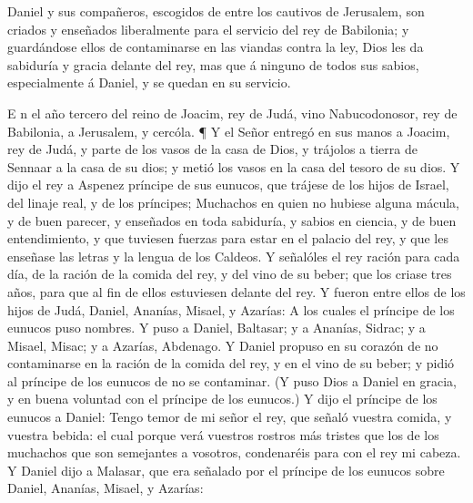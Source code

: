 \bchapter[capítulo]

\begin{chaptercomment}
 \footnotemarkchapter{}
Daniel y sus compañeros, escogidos de entre los cautivos de Jerusalem, son
  criados y enseñados liberalmente para el servicio del rey de Babilonia; y guardándose
  ellos de contaminarse en las viandas contra la ley, Dios les da sabiduría
  y gracia delante del rey, mas que á ninguno de todos sus sabios, especialmente
  á Daniel, y se quedan en su servicio.
\end{chaptercomment}

\vspace{\baselineskip}

\bversenonum \lettrine[lines=6,loversize=0.05,lraise=+0.08]{E}{}%
n el año tercero del reino de Joacim, rey de Judá, vino Nabucodonosor, rey de Babilonia, a Jerusalem, y cercóla.
\bverse ¶ Y el Señor entregó en sus manos a Joacim, rey de Judá, y parte de los vasos de la casa de Dios, y trájolos a tierra de Sennaar a la casa de su dios; y metió los vasos en la casa del tesoro de su dios.
\bverse Y dijo el rey a Aspenez príncipe de sus eunucos, que trájese de los hijos de Israel, del linaje real, y de los príncipes;
\bverse Muchachos en quien no hubiese alguna mácula, y de buen parecer, y enseñados en toda sabiduría, y sabios en ciencia, y de buen entendimiento, y que tuviesen fuerzas para estar en el palacio del rey, y que les enseñase las letras y la lengua de los Caldeos.
\bverse Y señalóles el rey ración para cada día, de la ración de la comida del rey, y del vino de su beber; que los criase tres años, para que al fin de ellos estuviesen delante del rey.
\bverse Y fueron entre ellos de los hijos de Judá, Daniel, Ananías, Misael, y Azarías:
\bverse A los cuales el príncipe de los eunucos puso nombres. Y puso a Daniel, Baltasar; y a Ananías, Sidrac; y a Misael, Misac; y a Azarías, Abdenago.
\bverse Y Daniel propuso en su corazón de no contaminarse en la ración de la comida del rey, y en el vino de su beber; y pidió al príncipe de los eunucos de no se contaminar.
\bverse (Y puso Dios a Daniel en gracia, y en buena voluntad con el príncipe de los eunucos.)
\bverse Y dijo el príncipe de los eunucos a Daniel: Tengo temor de mi señor el rey, que señaló vuestra comida, y vuestra bebida: el cual porque verá vuestros rostros más tristes que los de los muchachos que son semejantes a vosotros, condenaréis para con el rey mi cabeza.
\bverse Y Daniel dijo a Malasar, que era señalado por el príncipe de los eunucos sobre Daniel, Ananías, Misael, y Azarías:
